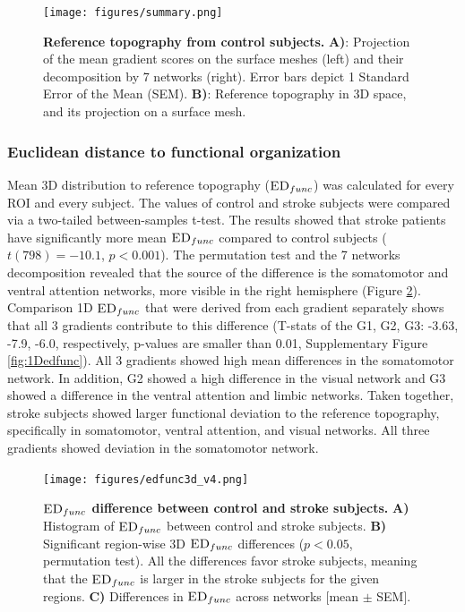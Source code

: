 \documentclass[fleqn,10pt]{wlscirep}
\begin{document}
\begin{figure}[]
\centering
\texttt{[image: figures/summary.png]}
\caption{\label{fig:summary} \textbf{Reference topography from control subjects.} \textbf{A)}: Projection of the mean gradient scores on the surface meshes (left) and their decomposition by 7 networks (right). Error bars depict 1 Standard Error of the Mean (SEM). \textbf{B)}: Reference topography in 3D space, and its projection on a surface mesh. } 
\end{figure}


\subsubsection*{Euclidean distance to functional organization}
Mean 3D distribution to reference topography ($\textsc{ED}_{func}$) was calculated for every ROI and every subject. The values of control and stroke subjects were compared via a two-tailed between-samples t-test. The results showed that stroke patients have significantly more mean $\textsc{ED}_{{func}}$ compared to control subjects ($t(798) = -10.1$, $p < 0.001$). The permutation test and the 7 networks decomposition revealed that the source of the difference is the somatomotor and ventral attention networks, more visible in the right hemisphere (Figure  \ref{fig:edfunc_wb}). Comparison 1D $\textsc{ED}_{{func}}$ that were derived from each gradient separately shows that all 3 gradients contribute to this difference (T-stats of the G1, G2, G3:  -3.63, -7.9, -6.0, respectively, p-values are smaller than 0.01, Supplementary Figure \ref{fig:1Dedfunc}). All 3 gradients showed high mean differences in the somatomotor network. In addition, G2 showed a high difference in the visual network and G3 showed a difference in the ventral attention and limbic networks. Taken together, stroke subjects showed larger functional deviation to the reference topography, specifically in somatomotor, ventral attention, and visual networks. All three gradients showed deviation in the somatomotor network. 
\begin{figure}[tb]
\centering
\texttt{[image: figures/edfunc3d\_v4.png]}
\caption{\label{fig:edfunc_wb} \textbf{$\textsc{ED}_{{func}}$ difference between control and stroke subjects.} \textbf{A)} Histogram of $\textsc{ED}_{{func}}$ between control and stroke subjects. \textbf{B)} Significant region-wise 3D $\textsc{ED}_{{func}}$ differences ($p<0.05$, permutation test). All the differences favor stroke subjects, meaning that the $\textsc{ED}_{{func}}$ is larger in the stroke subjects for the given regions.  \textbf{C)} Differences in $\textsc{ED}_{{func}}$ across networks [mean $\pm$ SEM].} 
\end{figure}
\end{document}
